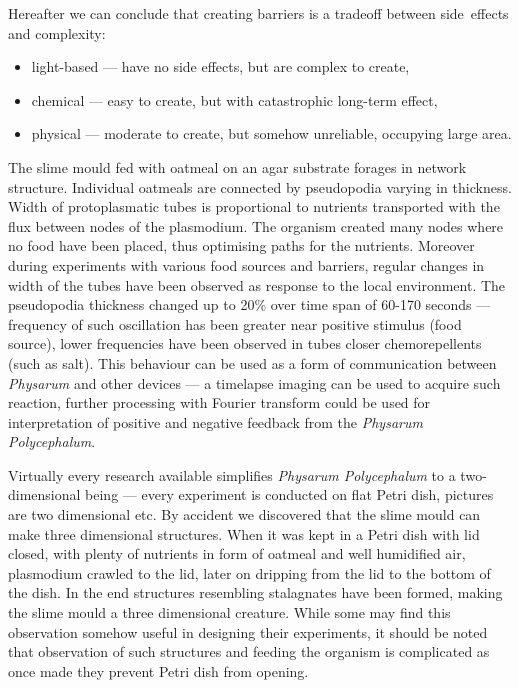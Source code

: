 Hereafter we can conclude that creating barriers is a tradeoff between side~effects and complexity:
\begin{itemize}
  \item light-based --- have no side effects, but are complex to create,
  \item chemical --- easy to create, but with catastrophic long-term effect,
  \item physical --- moderate to create, but somehow unreliable, occupying large area.
\end{itemize}

The slime mould fed with oatmeal on an agar substrate forages in network structure. Individual oatmeals are connected by pseudopodia varying in thickness. Width of protoplasmatic tubes is proportional to nutrients transported with the flux between nodes of the plasmodium. The organism created many nodes where no food have been placed, thus optimising paths for the nutrients. Moreover during experiments with various food sources and barriers, regular changes in width of the tubes have been observed as response to the local environment. The pseudopodia thickness changed up to 20\% over time span of 60-170 seconds --- frequency of such oscillation has been greater near positive stimulus (food source), lower frequencies have been observed in tubes closer chemorepellents (such as salt). This behaviour can be used as a form of communication between \textit{Physarum} and other devices --- a timelapse imaging can be used to acquire such reaction, further processing with Fourier transform \cite{bracewell1965fourier} could be used for interpretation of positive and negative feedback from the \textit{Physarum Polycephalum}.

Virtually every research available simplifies \textit{Physarum Polycephalum} to a two-dimensional being --- every experiment is conducted on flat Petri dish, pictures are two dimensional etc. By accident we discovered that the slime mould can make three dimensional structures. When it was kept in a Petri dish with lid closed, with plenty of nutrients in form of oatmeal and well humidified air, plasmodium crawled to the lid, later on dripping from the lid to the bottom of the dish. In the end structures resembling stalagnates have been formed, making the slime mould a three dimensional creature. While some may find this observation somehow useful in designing their experiments, it should be noted that observation of such structures and feeding the organism is complicated as once made they prevent Petri dish from opening. 

